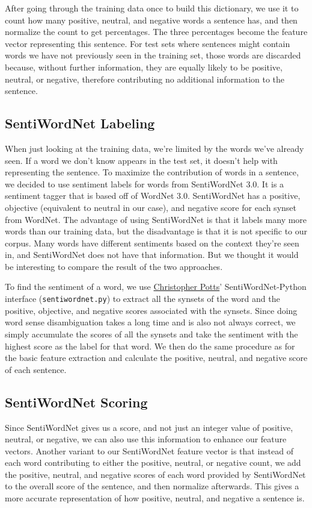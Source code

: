 \documentclass{article}
\begin{document}
After going through the training data once to build this dictionary, we use it to count how many positive, neutral, and negative words a sentence has, and then normalize the count to get percentages. The three percentages become the feature vector representing this sentence. For test sets where sentences might contain words we have not previously seen in the training set, those words are discarded because, without further information, they are equally likely to be positive, neutral, or negative, therefore contributing no additional information to the sentence.

\subsection{SentiWordNet Labeling}

When just looking at the training data, we're limited by the words we've already seen. If a word we don't know appears in the test set, it doesn't help with representing the sentence. To maximize the contribution of words in a sentence, we decided to use sentiment labels for words from SentiWordNet 3.0. It is a sentiment tagger that is based off of WordNet 3.0. SentiWordNet has a positive, objective (equivalent to neutral in our case), and negative score for each synset from WordNet. The advantage of using SentiWordNet is that it labels many more words than our training data, but the disadvantage is that it is not specific to our corpus. Many words have different sentiments based on the context they're seen in, and SentiWordNet does not have that information. But we thought it would be interesting to compare the result of the two approaches.

To find the sentiment of a word, we use \href{http://compprag.christopherpotts.net/wordnet.html}{Christopher Potts}' SentiWordNet-Python interface (\texttt{sentiwordnet.py}) to extract all the synsets of the word and the positive, objective, and negative scores associated with the synsets. Since doing word sense disambiguation takes a long time and is also not always correct, we simply accumulate the scores of all the synsets and take the sentiment with the highest score as the label for that word. We then do the same procedure as for the basic feature extraction and calculate the positive, neutral, and negative score of each sentence.

\subsection{SentiWordNet Scoring}
Since SentiWordNet gives us a score, and not just an integer value of positive, neutral, or negative, we can also use this information to enhance our feature vectors. Another variant to our SentiWordNet feature vector is that instead of each word contributing to either the positive, neutral, or negative count, we add the positive, neutral, and negative scores of each word provided by SentiWordNet to the overall score of the sentence, and then normalize afterwards. This gives a more accurate representation of how positive, neutral, and negative a sentence is.
\end{document}
